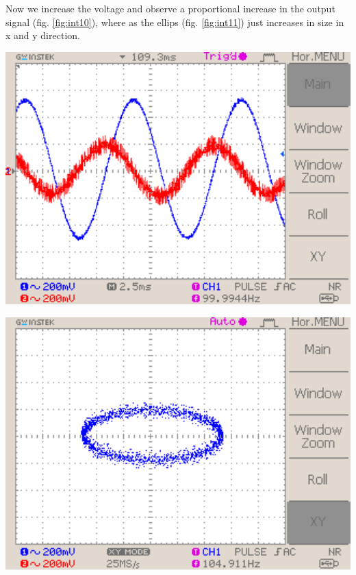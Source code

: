 \documentclass[a4paper,10pt]{article}
\newenvironment{Figure}
        {\par\medskip\noindent\minipage{\linewidth}}
        {\endminipage\par\medskip}
\numberwithin{equation}{section}
\begin{document}
\begin{multicols}{2}
  Now we increase the voltage and observe a proportional increase in the output signal (fig. \ref{fig:int10}), where as the ellips (fig. \ref{fig:int11}) just increases in size in x and y direction.
	\begin{Figure}
		\centering
		\includegraphics[width=1\textwidth]{../data/DS0043_n.png}
		\label{fig:int10}
	\end{Figure}
	\begin{Figure}
		\centering
		\includegraphics[width=1\textwidth]{../data/DS0042_n.png}
		\label{fig:int11}
	\end{Figure}


\end{multicols}
\end{document}
